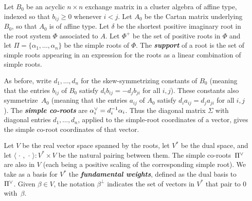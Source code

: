 \documentclass{amsart}
\theoremstyle{definition}
\theoremstyle{remark}
\numberwithin{equation}{section}
\newcommand{\newword}[1]{\textbf{\emph{#1}}}
\newcommand{\ep}{\varepsilon}
\newcommand{\set}[1]{{\lbrace #1 \rbrace}}
\newcommand{\br}[1]{{\langle #1 \rangle}}
\newcommand{\ck}{\spcheck}
\newcommand{\0}{{\mathbf{0}}}
\newcommand{\tB}{{\tilde{B}}}
\newcommand{\RSChar}{\Phi}
\newcommand{\RS}{\RSChar}
\newcommand{\RSpos}{\RS^+}
\newcommand{\SimplesChar}{\Pi}
\newcommand{\Simples}{\SimplesChar}
\begin{document}
Let $B_0$ be an acyclic $n\times n$ exchange matrix in a cluster algebra of affine type, indexed so that $b_{ij}\ge0$ whenever $i<j$.
Let $A_0$ be the Cartan matrix underlying $B_0$, so that $A_0$ is of affine type.
Let $\delta$ be the shortest positive imaginary root in the root system $\RS$ associated to $A$.
Let $\RSpos$ be the set of positive roots in $\RS$ and let $\Simples=\set{\alpha_1,\ldots,\alpha_n}$ be the simple roots of $\RS$.
The \newword{support} of a root is the set of simple roots appearing in an expression for the roots as a linear combination of simple roots.

As before, write $d_1,\ldots,d_n$ for the skew-symmetrizing constants of $B_0$ (meaning that the entries $b_{ij}$ of $B_0$ satisfy $d_i b_{ij}=-d_j b_{ji}$ for all $i,j$).
These constants also symmetrize~$A_0$ (meaning that the entries $a_{ij}$ of $A_0$ satisfy $d_i a_{ij}=d_j a_{ji}$ for all $i,j$).
The \newword{simple co-roots} are $\alpha_i\ck= d_i^{-1} \alpha_i$. 
Thus the diagonal matrix $\Sigma$ with diagonal entries $d_1,\ldots,d_n$, applied to the simple-root coordinates of a vector, gives the simple co-root coordinates of that vector.

Let $V$ be the real vector space spanned by the roots, let $V^*$ be the dual space, and let $\br{\,\cdot\,,\,\cdot\,}:V^*\times V$ be the natural pairing between them.
The simple co-roots~$\Simples\ck$ are also in $V$ (each being a positive scaling of the corresponding simple root).
We take as a basis for $V^*$ the \newword{fundamental weights}, defined as the dual basis to~$\Simples\ck$.
Given $\beta\in V$, the notation $\beta^\perp$ indicates the set of vectors in $V^*$ that pair to $0$ with~$\beta$. 
\end{document}
